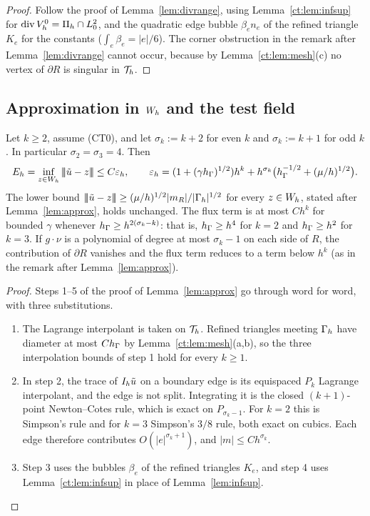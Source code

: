 \begin{proof}
Follow the proof of Lemma~\ref{lem:divrange}, using Lemma~\ref{ct:lem:infsup} for $\operatorname{div}V_h^0=\Pi_h\cap L^2_0$, and the quadratic edge bubble $\beta_en_e$ of the refined triangle $K_e$ for the constants ($\int_e\beta_e=|e|/6$). The corner obstruction in the remark after Lemma~\ref{lem:divrange} cannot occur, because by Lemma~\ref{ct:lem:mesh}(c) no vertex of $\partial R$ is singular in $\mathcal T_h$.
\end{proof}

\subsection{Approximation in \texorpdfstring{$\Wh$}{W\_h} and the test field}

\begin{lemma}[Approximation in $\Wh$, $k\ge2$]\label{ct:lem:approx}
Let $k\ge2$, assume (CT0), and let $\sigma_k:=k+2$ for even $k$ and $\sigma_k:=k+1$ for odd $k$. In particular $\sigma_2=\sigma_3=4$. Then
\[
E_h=\inf_{z\in W_h}|\!|\!|\tilde u-z|\!|\!|\le C\varepsilon_h,\qquad\varepsilon_h=(1+(\gamma h_\Gamma)^{1/2})h^k+h^{\sigma_k}\bigl(h_\Gamma^{-1/2}+(\mu/h)^{1/2}\bigr).
\]
The lower bound $|\!|\!|\tilde u-z|\!|\!|\ge(\mu/h)^{1/2}|m_R|/|\Gamma_h|^{1/2}$ for every $z\in W_h$, stated after Lemma~\ref{lem:approx}, holds unchanged. The flux term is at most $Ch^k$ for bounded $\gamma$ whenever $h_\Gamma\ge h^{2(\sigma_k-k)}$: that is, $h_\Gamma\ge h^4$ for $k=2$ and $h_\Gamma\ge h^2$ for $k=3$. If $g\cdot\nu$ is a polynomial of degree at most $\sigma_k-1$ on each side of $R$, the contribution of $\partial R$ vanishes and the flux term reduces to a term below $h^k$ (as in the remark after Lemma~\ref{lem:approx}).
\end{lemma}

\begin{proof}
Steps 1--5 of the proof of Lemma~\ref{lem:approx} go through word for word, with three substitutions.
\begin{enumerate}
\item The Lagrange interpolant is taken on $\mathcal T_h$. Refined triangles meeting $\Gamma_h$ have diameter at most $Ch_\Gamma$ by Lemma~\ref{ct:lem:mesh}(a,b), so the three interpolation bounds of step 1 hold for every $k\ge1$.
\item In step 2, the trace of $I_h\tilde u$ on a boundary edge is its equispaced $P_k$ Lagrange interpolant, and the edge is not split. Integrating it is the closed $(k+1)$-point Newton--Cotes rule, which is exact on $P_{\sigma_k-1}$. For $k=2$ this is Simpson's rule and for $k=3$ Simpson's $3/8$ rule, both exact on cubics. Each edge therefore contributes $O(|e|^{\sigma_k+1})$, and $|m|\le Ch^{\sigma_k}$.
\item Step 3 uses the bubbles $\beta_e$ of the refined triangles $K_e$, and step 4 uses Lemma~\ref{ct:lem:infsup} in place of Lemma~\ref{lem:infsup}.\qedhere
\end{enumerate}
\end{proof}

